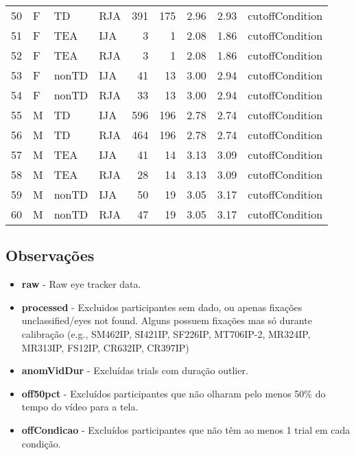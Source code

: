 \documentclass{article}
\begin{document}
\begin{table}[ht]
\begin{tabular}{rlllrrrrl}
  50 & F & TD & RJA & 391 & 175 & 2.96 & 2.93 & cutoffCondition \\ 
  51 & F & TEA & IJA &   3 &   1 & 2.08 & 1.86 & cutoffCondition \\ 
  52 & F & TEA & RJA &   3 &   1 & 2.08 & 1.86 & cutoffCondition \\ 
  53 & F & nonTD & IJA &  41 &  13 & 3.00 & 2.94 & cutoffCondition \\ 
  54 & F & nonTD & RJA &  33 &  13 & 3.00 & 2.94 & cutoffCondition \\ 
  55 & M & TD & IJA & 596 & 196 & 2.78 & 2.74 & cutoffCondition \\ 
  56 & M & TD & RJA & 464 & 196 & 2.78 & 2.74 & cutoffCondition \\ 
  57 & M & TEA & IJA &  41 &  14 & 3.13 & 3.09 & cutoffCondition \\ 
  58 & M & TEA & RJA &  28 &  14 & 3.13 & 3.09 & cutoffCondition \\ 
  59 & M & nonTD & IJA &  50 &  19 & 3.05 & 3.17 & cutoffCondition \\ 
  60 & M & nonTD & RJA &  47 &  19 & 3.05 & 3.17 & cutoffCondition \\ 
   \hline
\end{tabular}
\end{table}


\subsection{Observações}

\begin{itemize}
  \item \textbf{raw} - Raw eye tracker data. 
  \item \textbf{processed} - Excluidos participantes sem dado, ou apenas fixações unclassified/eyes not found. Alguns possuem fixações mas só durante calibração (e.g., SM462IP, SI421IP, SF226IP, MT706IP-2, MR324IP, MR313IP, FS12IP, CR632IP, CR397IP)
  \item \textbf{anomVidDur} - Excluídas trials com duração outlier.
  \item \textbf{off50pct} - Excluídos participantes que não olharam pelo menos 50\% do tempo do vídeo para a tela.
  \item \textbf{offCondicao} - Excluídos participantes que não têm ao menos 1 trial em cada condição.
\end{itemize}
\end{document}
